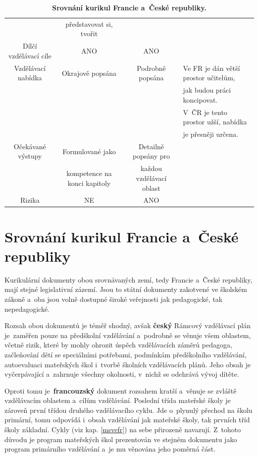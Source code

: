 \begin{landscape}
\begin{table}[t]
\begin{tabular}{|c|c|c|l|}
\rowcolor{grey!10}
					& představovat si, tvořit 	&						& 	\\		
\rowcolor{grey!50}
Dílčí vzdělávací cíle	& ANO					& ANO 					& 	\\	
\rowcolor{grey!10}
Vzdělávací nabídka	& Okrajově popsána	 		& Podrobně popsána	 	& Ve FR je dán větší prostor učitelům, 	\\
\rowcolor{grey!10}
					&							&						& jak budou práci koncipovat. 			\\
\rowcolor{grey!10}
					&							&						& V~ČR je tento prostor užší, nabídka 	\\
\rowcolor{grey!10}
					&							&						& je přesněji určena. 					\\
\rowcolor{grey!50}
Očekávané výstupy	& Formulované jako 				& Detailně popsány pro 		& 		\\ 
\rowcolor{grey!50}
					& kompetence na konci kapitoly 	& každou vzdělávací oblast 	& 		\\
\rowcolor{grey!10}
Rizika	 			& NE						& ANO	 						& 		\\
\hline
\end{tabular}
\caption{ \textbf{Srovnání kurikul Francie a~České republiky.}
}
\label{tab:srovnaniKurikul}
\end{table}
\end{landscape}

\section{Srovnání kurikul Francie a~České republiky}
\label{srovnanikurikulfrcr}

	Kurikulární dokumenty obou srovnávaných zemí, tedy Francie a~České republiky, mají stejné legislativní zázemí. Jsou to státní dokumenty zakotvené ve školském zákoně a~oba jsou volně dostupné široké veřejnosti jak pedagogické, tak nepedagogické. 

	Rozsah obou dokumentů je téměř shodný, avšak \textbf{český} Rámcový vzdělávací plán je zaměřen pouze na předškolní vzdělávání a~podrobně se věnuje všem oblastem, včetně rizik, které by mohly ohrozit úspěch vzdělávacích záměrů pedagoga, začleňování dětí se speciálními potřebami, podmínkám předškolního vzdělávání, autoevaluaci mateřských škol i~tvorbě školních vzdělávacích plánů. Jeho obsah je vyčerpávající a~zahrnuje všechny okolnosti, v~nichž se odehrává vývoj dítěte. 

	Oproti tomu je \textbf{francouzský} dokument rozsahem kratší a~věnuje se zvláště vzdělávacím oblastem a~cílům vzdělávání. Poslední třída mateřské školy je zároveň první třídou druhého vzdělávacího cyklu. Jde o~plynulý přechod na školu primární, tomu odpovídá i~obsah vzdělávání jak mateřské školy, tak prvních tříd školy základní. Cykly (viz kap. \ref{msvefr}) na sebe přirozeně navazují. Z~tohoto důvodu je program mateřských škol prezentován ve stejném dokumentu jako program primárního vzdělávání a~je mu věnována jeho poměrná část.

